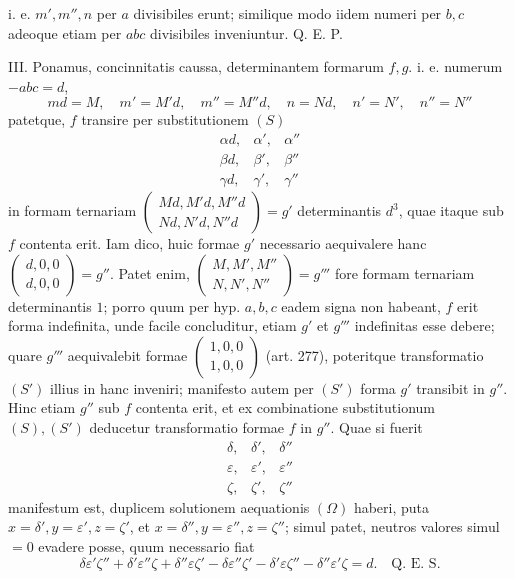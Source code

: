 i. e. \(m',m'',n\) per \(a\) divisibiles erunt; similique modo iidem numeri per \(b,c\) adeoque etiam per \(abc\) divisibiles inveniuntur. Q. E. P.
\par
III. Ponamus, concinnitatis caussa, determinantem formarum \(f,g\). i. e. numerum \(-abc=d\),
\[
md=M,\quad m'=M'd,\quad m''=M''d,\quad n=Nd,\quad n'=N',\quad n''=N''
\]
patetque, \(f\) transire per substitutionem \((S)\)
\[
\begin{array}{ccc}
\alpha d,&\alpha',&\alpha''\\
\beta d,&\beta',&\beta''\\
\gamma d,&\gamma',&\gamma''
\end{array}
\]
in formam ternariam \(\left(\begin{smallmatrix}Md,M'd,M''d\\Nd,N'd,N''d\end{smallmatrix}\right)=g'\) determinantis \(d^3\), quae itaque sub \(f\) contenta erit. Iam dico, huic formae \(g'\) necessario aequivalere hanc \(\left(\begin{smallmatrix}d,0,0\\d,0,0\end{smallmatrix}\right)=g''\). Patet enim, \(\left(\begin{smallmatrix}M,M',M''\\N,N',N''\end{smallmatrix}\right)=g'''\) fore formam ternariam determinantis \(1\); porro quum per hyp. \(a,b,c\) eadem signa non habeant, \(f\) erit forma indefinita, unde facile concluditur, etiam \(g'\) et \(g'''\) indefinitas esse debere; quare \(g'''\) aequivalebit formae \(\left(\begin{smallmatrix}1,0,0\\1,0,0\end{smallmatrix}\right)\) (art. 277), poteritque transformatio \((S')\) illius in hanc inveniri; manifesto autem per \((S')\) forma \(g'\) transibit in \(g''\). Hinc etiam \(g''\) sub \(f\) contenta erit, et ex combinatione substitutionum \((S),(S')\) deducetur transformatio formae \(f\) in \(g''\). Quae si fuerit
\[
\begin{array}{ccc}
\delta,&\delta',&\delta''\\
\varepsilon,&\varepsilon',&\varepsilon''\\
\zeta,&\zeta',&\zeta''
\end{array}
\]
manifestum est, duplicem solutionem aequationis \((\Omega)\) haberi, puta \(x=\delta',y=\varepsilon',z=\zeta'\), et \(x=\delta'',y=\varepsilon'',z=\zeta''\); simul patet, neutros valores simul \(=0\) evadere posse, quum necessario fiat
\[
\delta\varepsilon'\zeta''+\delta'\varepsilon''\zeta+\delta''\varepsilon\zeta'-\delta\varepsilon''\zeta'-\delta'\varepsilon\zeta''-\delta''\varepsilon'\zeta=d.\quad\text{Q. E. S.}
\]


